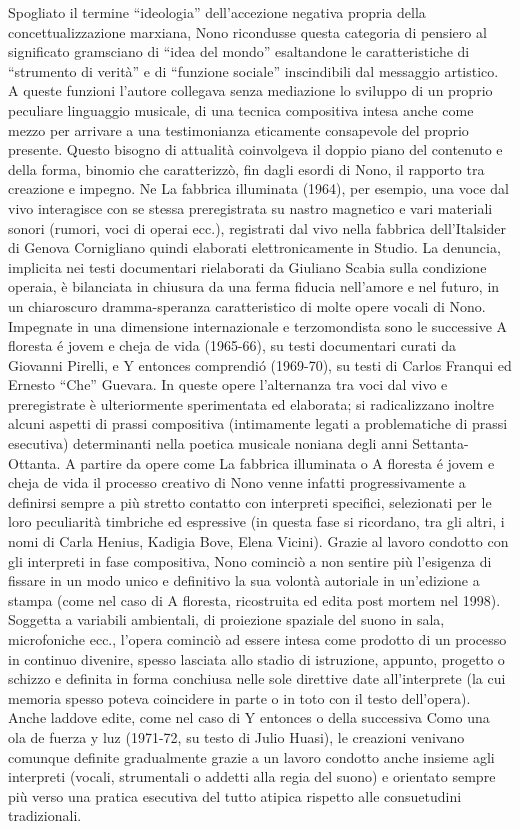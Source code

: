 Spogliato il termine “ideologia” dell’accezione negativa propria della concettualizzazione marxiana, Nono ricondusse questa categoria di pensiero al significato gramsciano di “idea del mondo” esaltandone le caratteristiche di “strumento di verità” e di “funzione sociale” inscindibili dal messaggio artistico. A queste funzioni l’autore collegava senza mediazione lo sviluppo di un proprio peculiare linguaggio musicale, di una tecnica compositiva intesa anche come mezzo per arrivare a una testimonianza eticamente consapevole del proprio presente. Questo bisogno di attualità coinvolgeva il doppio piano del contenuto e della forma, binomio che caratterizzò, fin dagli esordi di Nono, il rapporto tra creazione e impegno. Ne La fabbrica illuminata (1964), per esempio, una voce dal vivo interagisce con se stessa preregistrata su nastro magnetico e vari materiali sonori (rumori, voci di operai ecc.), registrati dal vivo nella fabbrica dell’Italsider di Genova Cornigliano quindi elaborati elettronicamente in Studio. La denuncia, implicita nei testi documentari rielaborati da Giuliano Scabia sulla condizione operaia, è bilanciata in chiusura da una ferma fiducia nell’amore e nel futuro, in un chiaroscuro dramma-speranza caratteristico di molte opere vocali di Nono. Impegnate in una dimensione internazionale e terzomondista sono le successive A floresta é jovem e cheja de vida (1965-66), su testi documentari curati da Giovanni Pirelli, e Y entonces comprendió (1969-70), su testi di Carlos Franqui ed Ernesto “Che” Guevara. In queste opere l’alternanza tra voci dal vivo e preregistrate è ulteriormente sperimentata ed elaborata; si radicalizzano inoltre alcuni aspetti di prassi compositiva (intimamente legati a problematiche di prassi esecutiva) determinanti nella poetica musicale noniana degli anni Settanta-Ottanta. A partire da opere come La fabbrica illuminata o A floresta é jovem e cheja de vida il processo creativo di Nono venne infatti progressivamente a definirsi sempre a più stretto contatto con interpreti specifici, selezionati per le loro peculiarità timbriche ed espressive (in questa fase si ricordano, tra gli altri, i nomi di Carla Henius, Kadigia Bove, Elena Vicini). Grazie al lavoro condotto con gli interpreti in fase compositiva, Nono cominciò a non sentire più l’esigenza di fissare in un modo unico e definitivo la sua volontà autoriale in un’edizione a stampa (come nel caso di A floresta, ricostruita ed edita post mortem nel 1998). Soggetta a variabili ambientali, di proiezione spaziale del suono in sala, microfoniche ecc., l’opera cominciò ad essere intesa come prodotto di un processo in continuo divenire, spesso lasciata allo stadio di istruzione, appunto, progetto o schizzo e definita in forma conchiusa nelle sole direttive date all’interprete (la cui memoria spesso poteva coincidere in parte o in toto con il testo dell’opera). Anche laddove edite, come nel caso di Y entonces o della successiva Como una ola de fuerza y luz (1971-72, su testo di Julio Huasi), le creazioni venivano comunque definite gradualmente grazie a un lavoro condotto anche insieme agli interpreti (vocali, strumentali o addetti alla regia del suono) e orientato sempre più verso una pratica esecutiva del tutto atipica rispetto alle consuetudini tradizionali.

